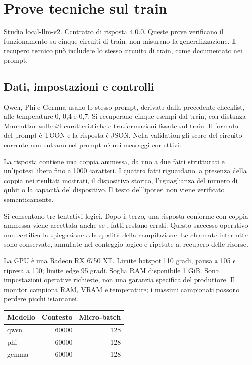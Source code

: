 \providecommand{\ValidationFiguresPath}{figures/}

\section{Prove tecniche sul train}

Studio local-llm-v2. Contratto di risposta 4.0.0. Queste prove verificano il funzionamento su cinque circuiti di train; non misurano la generalizzazione. Il recupero tecnico può includere lo stesso circuito di train, come documentato nei prompt.

\subsection{Dati, impostazioni e controlli}

Qwen, Phi e Gemma usano lo stesso prompt, derivato dalla precedente checklist, alle temperature 0, 0,4 e 0,7. Si recuperano cinque esempi dal train, con distanza Manhattan sulle 49 caratteristiche e trasformazioni fissate sul train. Il formato del prompt è TOON e la risposta è JSON. Nella validation gli score del circuito corrente non entrano nel prompt né nei messaggi correttivi.

La risposta contiene una coppia ammessa, da uno a due fatti strutturati e un'ipotesi libera fino a 1000 caratteri. I quattro fatti riguardano la presenza della coppia nei risultati mostrati, il dispositivo storico, l'uguaglianza del numero di qubit o la capacità del dispositivo. Il testo dell'ipotesi non viene verificato semanticamente.

Si consentono tre tentativi logici. Dopo il terzo, una risposta conforme con coppia ammessa viene accettata anche se i fatti restano errati. Questo successo operativo non certifica la spiegazione o la qualità della compilazione. Le chiamate interrotte sono conservate, annullate nel conteggio logico e ripetute al recupero delle risorse.

La GPU è una Radeon RX 6750 XT. Limite hotspot 110 gradi, pausa a 105 e ripresa a 100; limite edge 95 gradi. Soglia RAM disponibile 1 GiB. Sono impostazioni operative richieste, non una garanzia specifica del produttore. Il monitor campiona RAM, VRAM e temperature; i massimi campionati possono perdere picchi istantanei.

\begin{center}\begin{tabular}{lrr}\toprule Modello & Contesto & Micro-batch\\\midrule

qwen & 60000 & 128\\

phi & 60000 & 128\\

gemma & 60000 & 128\\

\bottomrule\end{tabular}\end{center}

